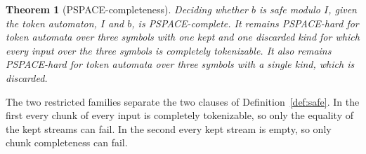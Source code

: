 \documentclass[11pt,a4paper]{article}
\theoremstyle{definition}
\theoremstyle{plain}
\newtheorem{theorem}{Theorem}
\begin{document}
\begin{theorem}[PSPACE-completeness]
\label{thm:pspace}
Deciding whether $b$ is safe modulo $I$, given the token automaton, $I$ and $b$, is PSPACE-complete. It remains
PSPACE-hard for token automata over three symbols with one kept and one discarded kind for which every input over the
three symbols is completely tokenizable. It also remains PSPACE-hard for token automata over three symbols with a single
kind, which is discarded.
\end{theorem}

The two restricted families separate the two clauses of Definition~\ref{def:safe}. In the first every chunk of every
input is completely tokenizable, so only the equality of the kept streams can fail. In the second every kept stream is
empty, so only chunk completeness can fail.
\end{document}
